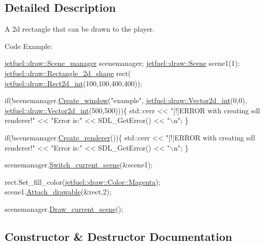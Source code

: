 \subsection{Detailed Description}
A 2d rectangle that can be drawn to the player.

Code Example\+: 
\begin{DoxyCode}
  \hyperlink{classjetfuel_1_1draw_1_1Scene__manager}{jetfuel::draw::Scene\_manager} scenemanager;
  \hyperlink{classjetfuel_1_1draw_1_1Scene}{jetfuel::draw::Scene} scene1(1);
  \hyperlink{classjetfuel_1_1draw_1_1Rectangle__2d__shape}{jetfuel::draw::Rectangle\_2d\_shape} rect(
   \hyperlink{classjetfuel_1_1draw_1_1Rect2d}{jetfuel::draw::Rect2d\_int}(100,100,400,400));

\textcolor{keywordflow}{if}(!scenemanager.\hyperlink{classjetfuel_1_1draw_1_1Scene__manager_a5113e9062c272a22d383ba872417ba31}{Create\_window}(\textcolor{stringliteral}{"example"},
                         \hyperlink{classjetfuel_1_1draw_1_1Vector2d}{jetfuel::draw::Vector2d\_int}(0,0),
                         \hyperlink{classjetfuel_1_1draw_1_1Vector2d}{jetfuel::draw::Vector2d\_int}(500,500)))\{
   std::cerr << \textcolor{stringliteral}{"[!]ERROR with creating sdl renderer!"} <<
   \textcolor{stringliteral}{"Error is:"} << SDL\_GetError() << \textcolor{stringliteral}{"\(\backslash\)n"};
\}

  \textcolor{keywordflow}{if}(!scenemanager.\hyperlink{classjetfuel_1_1draw_1_1Scene__manager_afafecd926ce5e4b2543a6d583a7d24b6}{Create\_renderer}())\{
       std::cerr << \textcolor{stringliteral}{"[!]ERROR with creating sdl renderer!"} <<
      \textcolor{stringliteral}{"Error is:"} << SDL\_GetError() << \textcolor{stringliteral}{"\(\backslash\)n"};
  \}

  scenemanager.\hyperlink{classjetfuel_1_1draw_1_1Scene__manager_a770c163b88ba8427539ee182315ea989}{Switch\_current\_scene}(&scene1);

  rect.Set\_fill\_color(\hyperlink{classjetfuel_1_1draw_1_1Color_a4382e35bf37821db21480378fd6e9c6d}{jetfuel::draw::Color::Magenta});
  scene1.\hyperlink{classjetfuel_1_1draw_1_1Scene_aea4b4c4ae25c30d661be4c52787e0ea3}{Attach\_drawable}(&rect,2);

  scenemanager.\hyperlink{classjetfuel_1_1draw_1_1Scene__manager_a8af9a3abfd5121b1b8556342de435773}{Draw\_current\_scene}();
\end{DoxyCode}
 

\subsection{Constructor \& Destructor Documentation}
\mbox{\label{classjetfuel_1_1draw_1_1Rectangle__2d__shape_a4ee9006d8e9d043092eff698ab484210}} 
